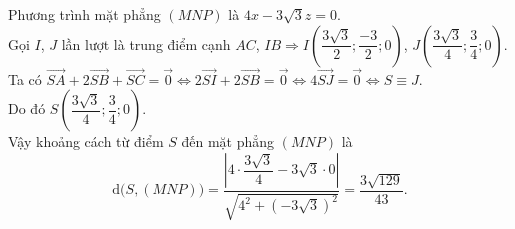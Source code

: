\begin{ex}
{		Phương trình mặt phẳng  $(MNP)$ là $4x-3\sqrt{3}z=0$.\\
		Gọi $I$, $J$ lần lượt là trung điểm cạnh $AC$, $IB\Rightarrow I\left(\dfrac{3\sqrt{3}}{2};\dfrac{-3}{2};0\right)$,  $J\left(\dfrac{3\sqrt{3}}{4};\dfrac{3}{4};0\right)$.\\
		Ta có $\overrightarrow{SA}+2\overrightarrow{SB}+\overrightarrow{SC}=\overrightarrow{0}\Leftrightarrow 2\overrightarrow{SI}+2\overrightarrow{SB}=\overrightarrow{0}\Leftrightarrow 4\overrightarrow{SJ}=\overrightarrow{0}\Leftrightarrow S\equiv  J$.\\
		 Do đó $S\left(\dfrac{3\sqrt{3}}{4};\dfrac{3}{4};0\right)$.\\
		 Vậy khoảng cách từ điểm $S$ đến mặt phẳng $(MNP)$ là
		\[\mathrm{d}\Big(S,(MNP)\Big)=\dfrac{\left|4\cdot  \dfrac{3\sqrt 3}{4}-3\sqrt 3\cdot 0\right|}{\sqrt{4^2+\left(-3\sqrt 3\right)^2}}=\dfrac{3\sqrt{129}}{43}.\]
	 }
\end{ex}

